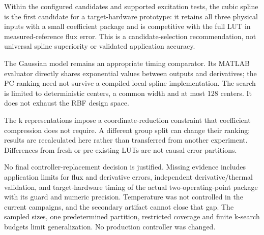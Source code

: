 Within the configured candidates and supported excitation tests, the cubic spline is the first candidate for a target-hardware prototype: it retains all three physical inputs with a small coefficient package and is competitive with the full LUT in measured-reference flux error. This is a candidate-selection recommendation, not universal spline superiority or validated application accuracy.

The Gaussian model remains an appropriate timing comparator. Its MATLAB evaluator directly shares exponential values between outputs and derivatives; the PC ranking need not survive a compiled local-spline implementation. The search is limited to deterministic centers, a common width and at most 128 centers. It does not exhaust the RBF design space.

The k representations impose a coordinate-reduction constraint that coefficient compression does not require. A different group split can change their ranking; results are recalculated here rather than transferred from another experiment. Differences from fresh or pre-existing LUTs are not causal error partitions.

No final controller-replacement decision is justified. Missing evidence includes application limits for flux and derivative errors, independent derivative/thermal validation, and target-hardware timing of the actual two-operating-point package with its guard and numeric precision. Temperature was not controlled in the current campaigns, and the secondary artifact cannot close that gap. The sampled sizes, one predetermined partition, restricted coverage and finite k-search budgets limit generalization. No production controller was changed.
